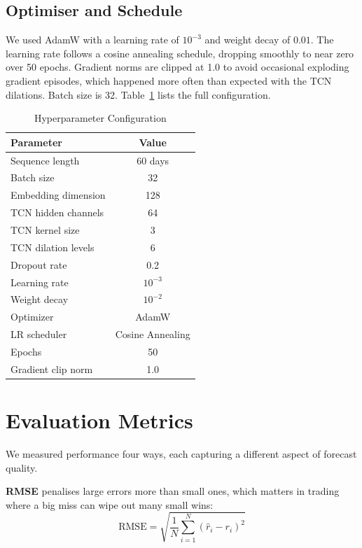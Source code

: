 \documentclass[conference]{IEEEtran}
\begin{document}
\subsection{Optimiser and Schedule}
We used AdamW \cite{loshchilov2019} with a learning rate of $10^{-3}$ and weight decay of $0.01$. The learning rate follows a cosine annealing schedule, dropping smoothly to near zero over 50 epochs. Gradient norms are clipped at 1.0 to avoid occasional exploding gradient episodes, which happened more often than expected with the TCN dilations. Batch size is 32. Table~\ref{tab:hyperparams} lists the full configuration.

\begin{table}[htbp]
\caption{Hyperparameter Configuration}
\label{tab:hyperparams}
\centering
\begin{tabular}{lc}
\toprule
\textbf{Parameter} & \textbf{Value} \\
\midrule
Sequence length & 60 days \\
Batch size & 32 \\
Embedding dimension & 128 \\
TCN hidden channels & 64 \\
TCN kernel size & 3 \\
TCN dilation levels & 6 \\
Dropout rate & 0.2 \\
Learning rate & $10^{-3}$ \\
Weight decay & $10^{-2}$ \\
Optimizer & AdamW \\
LR scheduler & Cosine Annealing \\
Epochs & 50 \\
Gradient clip norm & 1.0 \\
\bottomrule
\end{tabular}
\end{table}

\section{Evaluation Metrics}
We measured performance four ways, each capturing a different aspect of forecast quality.

\textbf{RMSE} penalises large errors more than small ones, which matters in trading where a big miss can wipe out many small wins:
\begin{equation}
\text{RMSE} = \sqrt{\frac{1}{N}\sum_{i=1}^{N}(\hat{r}_i - r_i)^2}
\end{equation}
\end{document}
